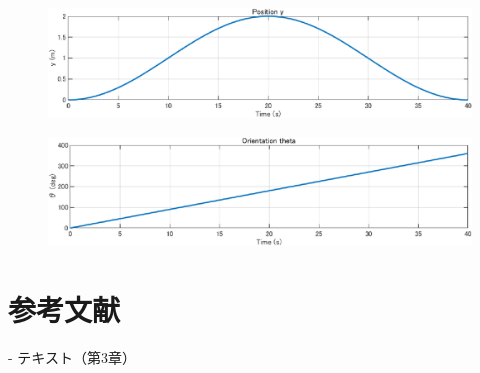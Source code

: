 \documentclass[10pt,a4paper,titlepage]{jreport} %
\begin{document}
\begin{figure}[H] %
  \centering
  \includegraphics[width=0.6\linewidth]{242C2016_NaoOkumura_3_3_c.eps} %
\end{figure}

\begin{figure}[H] %
  \centering
  \includegraphics[width=0.6\linewidth]{242C2016_NaoOkumura_3_3_d.eps} %
\end{figure}

\chapter{参考文献}

- テキスト（第3章）
\end{document}
